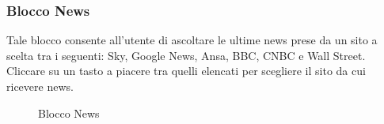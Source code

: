 \subsubsection{Blocco News}
Tale blocco consente all'utente di ascoltare le ultime news prese da un sito a scelta tra i seguenti: Sky, Google News, Ansa, BBC, CNBC e Wall Street. Cliccare su un tasto a piacere tra quelli elencati per scegliere il sito da cui ricevere news.
	\begin{figure}[!ht]
		\centering
		\caption{Blocco News}
	\end{figure}
\newpage

